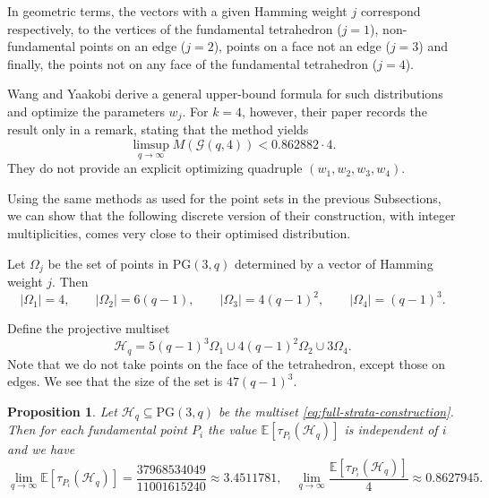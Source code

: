\documentclass{article}
\newtheorem{proposition}{Proposition}
\newcommand{\PG}{\mathrm{PG}}
\newcommand{\Gscr}{\mathscr{G}}
\newcommand{\E}{\mathbb{E}}
\begin{document}
In geometric terms, the vectors with a given Hamming weight $j$ correspond respectively, to the vertices of the fundamental tetrahedron ($j=1$), non-fundamental points on an edge ($j=2$), points on a face not an edge ($j=3$) and finally, the points not on any face of the fundamental tetrahedron ($j=4$). 

Wang and Yaakobi derive a general upper-bound formula for such distributions
and optimize the parameters $w_j$. For $k=4$, however, their paper records the
result only in a remark, stating that the method yields
\[
 \limsup_{q\to\infty}M(\Gscr(q,4))<0.862882\cdot4.
\]
They do not provide an explicit optimizing quadruple
$(w_1,w_2,w_3,w_4)$. 


Using the same methods as used for the point sets in the previous Subsections, we can show that the following discrete version of their construction, with integer multiplicities, comes very close to their optimised distribution.

Let $\Omega_j$ be the set of points in $\PG(3,q)$ determined by a vector of Hamming weight $j$. Then
\[
|\Omega_1|=4,\qquad |\Omega_2|=6(q-1),\qquad
|\Omega_3|=4(q-1)^2,\qquad |\Omega_4|=(q-1)^3.
\]


Define the projective multiset
\begin{equation}
\label{eq:full-strata-construction}
\mathcal H_q
 =5(q-1)^3\Omega_1\cup4(q-1)^2\Omega_2\cup3\Omega_4.
\end{equation}
Note that we do not take points on the face of the tetrahedron, except those on edges.
We see that the size of the set is $47(q-1)^3$.
 
\begin{proposition}\label{prop:fullstrata}
Let $\mathcal H_q\subseteq\PG(3,q)$ be the multiset \eqref{eq:full-strata-construction}.
Then for each fundamental point $P_i$ the value $\E[\tau_{P_i}(\mathcal H_q)]$ is
independent of $i$ and we have
\[
\lim_{q\to\infty}\E[\tau_{P_i}(\mathcal H_q)]
   =\frac{37968534049}{11001615240}\approx 3.4511781 ,
\quad
\lim_{q\to\infty}\frac{\E[\tau_{P_i}(\mathcal H_q)]}{4}
   \approx 0.8627945 .
\]
\end{proposition}
\end{document}
